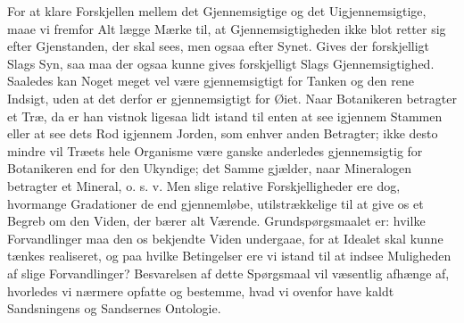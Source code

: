 \documentclass[11pt]{book}
\newcommand{\opage}[1]{\marginnote{\footnotesize\textit{[#1]}}}
\begin{document}
For at klare Forskjellen mellem det Gjennemsigtige og det
Uigjennemsigtige, maae vi fremfor Alt lægge Mærke til, at
Gjennemsigtigheden ikke blot retter sig efter Gjenstanden, der skal
sees, men ogsaa efter Synet. Gives der forskjelligt Slags Syn, saa maa
der ogsaa kunne gives forskjelligt Slags Gjennemsigtighed. Saaledes kan
Noget meget vel være gjennemsigtigt for Tanken og den rene Indsigt,
uden at det derfor er gjennemsigtigt for Øiet. Naar Botanikeren
betragter et Træ, da er han vistnok ligesaa lidt istand til enten at
see igjennem Stammen eller at see dets Rod igjennem Jorden, som enhver
anden Betragter; ikke desto mindre vil Træets hele Organisme være
ganske anderledes gjennemsigtig for Botanikeren end for den Ukyndige;
det Samme gjælder, naar Mineralogen betragter et Mineral, o. s. v. Men
slige relative
\opage{255} \setcounter{footnote}{0}%
Forskjelligheder ere dog, hvormange Gradationer de end gjennemløbe,
utilstrækkelige til at give os et Begreb om den Viden, der bærer alt
Værende. Grundspørgsmaalet er: hvilke Forvandlinger maa den os
bekjendte Viden undergaae, for at Idealet skal kunne tænkes realiseret,
og paa hvilke Betingelser ere vi istand til at indsee Muligheden af
slige Forvandlinger? Besvarelsen af dette Spørgsmaal vil væsentlig
afhænge af, hvorledes vi nærmere opfatte og bestemme, hvad vi ovenfor
have kaldt Sandsningens og Sandsernes Ontologie.
\end{document}
